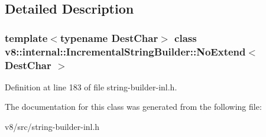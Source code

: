 \subsection{Detailed Description}
\subsubsection*{template$<$typename Dest\+Char$>$\newline
class v8\+::internal\+::\+Incremental\+String\+Builder\+::\+No\+Extend$<$ Dest\+Char $>$}



Definition at line 183 of file string-\/builder-\/inl.\+h.



The documentation for this class was generated from the following file\+:\begin{DoxyCompactItemize}
\item 
v8/src/string-\/builder-\/inl.\+h\end{DoxyCompactItemize}
